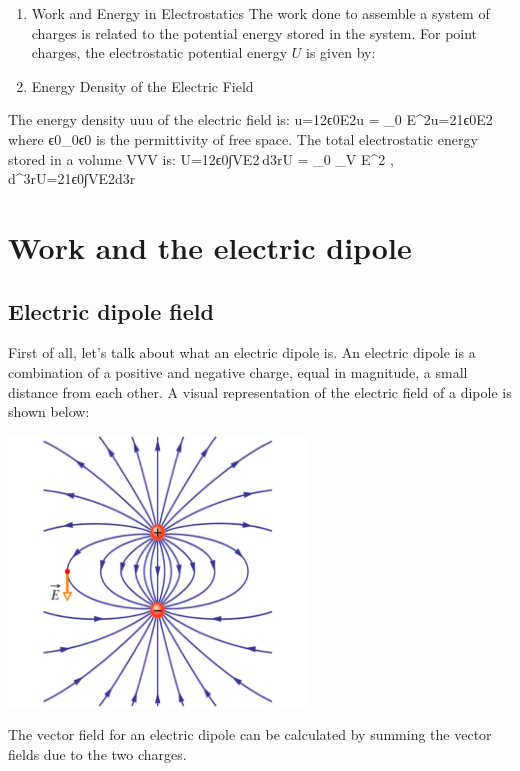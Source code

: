 \documentclass[
  letterpaper,
  DIV=11,
  numbers=noendperiod]{scrreprt}
\begin{document}
\begin{enumerate}
\def\labelenumi{\arabic{enumi}.}
\setcounter{enumi}{9}
\item
  Work and Energy in Electrostatics The work done to assemble a system
  of charges is related to the potential energy stored in the system.
  For point charges, the electrostatic potential energy \(U\) is given
  by:
\item
  Energy Density of the Electric Field
\end{enumerate}

The energy density uuu of the electric field is: u=12ϵ0E2u = 
\epsilon\_0 E\^{}2u=21ϵ0E2 where ϵ0\epsilon\_0ϵ0 is the permittivity of
free space. The total electrostatic energy stored in a volume VVV is:
U=12ϵ0∫VE2 d3rU =  \epsilon\_0 \int\_V E\^{}2 ,
d\^{}3rU=21ϵ0∫VE2d3r

\section{Work and the electric
dipole}\label{work-and-the-electric-dipole}

\subsection{Electric dipole field}\label{electric-dipole-field}

First of all, let's talk about what an electric dipole is. An electric
dipole is a combination of a positive and negative charge, equal in
magnitude, a small distance from each other. A visual representation of
the electric field of a dipole is shown below:

\includegraphics[width=3.125in,height=\textheight]{Figures/dipole_field.png}

The vector field for an electric dipole can be calculated by summing the
vector fields due to the two charges.
\end{document}

